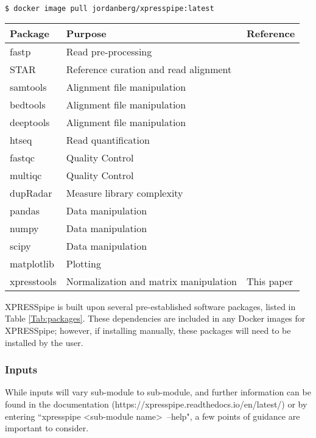 \documentclass[11pt, a4paper, oneside]{article}
\begin{document}
\begin{lstlisting}[language=bash, caption=curateReference example]
$ docker image pull jordanberg/xpresspipe:latest
\end{lstlisting}

\begin{tabular}{p{2.4cm}p{7.5cm}p{3cm}}
 \textbf{Package} & \textbf{Purpose} & \textbf{Reference} \\
 \hline
 fastp & Read pre-processing & \cite{fastp} \\
 \hline
 STAR & Reference curation and read alignment & \cite{star} \\
 \hline
 samtools & Alignment file manipulation & \cite{samtools} \\
 \hline
 bedtools & Alignment file manipulation & \cite{bedtools} \\
 \hline
 deeptools & Alignment file manipulation & \cite{deeptools} \\
 \hline
 htseq & Read quantification & \cite{htseq} \\
 \hline
 fastqc & Quality Control & \cite{fastqc} \\
 \hline
 multiqc & Quality Control & \cite{multiqc} \\
 \hline
 dupRadar & Measure library complexity & \cite{dupradar} \\
 \hline
 pandas & Data manipulation & \cite{pandas} \\
 \hline
 numpy & Data manipulation & \cite{numpy1, numpy2} \\
 \hline
 scipy & Data manipulation & \cite{scipy} \\
 \hline
 matplotlib & Plotting & \cite{matplotlib} \\
 \hline
 xpresstools & Normalization and matrix manipulation & This paper \\
\end{tabular}
\newline

XPRESSpipe is built upon several pre-established software packages, listed in Table \ref{Tab:packages}. These dependencies are included in any Docker images for XPRESSpipe; however, if installing manually, these packages will need to be installed by the user.

\subsubsection{Inputs}
While inputs will vary sub-module to sub-module, and further information can be found in the documentation (https://xpresspipe.readthedocs.io/en/latest/) or by entering ``xpresspipe \textless sub-module name\textgreater \ --help", a few points of guidance are important to consider.
\end{document}
